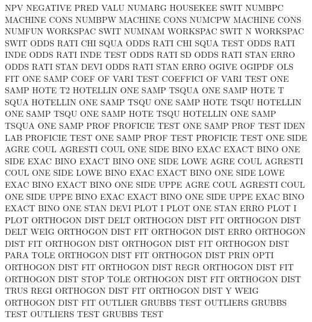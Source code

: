 NPV                                     NEGATIVE PRED VALU
NUMARG                                  HOUSEKEE SWIT
NUMBPC                                  MACHINE  CONS
NUMBPW                                  MACHINE  CONS
NUMCPW                                  MACHINE  CONS
NUMFUN                                  WORKSPAC SWIT
NUMNAM                                  WORKSPAC SWIT
N                                       WORKSPAC SWIT
ODDS     RATI CHI  SQUA                 ODDS     RATI CHI  SQUA TEST
ODDS     RATI INDE                      ODDS     RATI INDE TEST
ODDS     RATI SD                        ODDS     RATI STAN ERRO
ODDS     RATI STAN DEVI                 ODDS     RATI STAN ERRO
OGIVE                                   OGIPDF
OLS                                     FIT
ONE      SAMP COEF OF   VARI TEST       COEFFICI OF   VARI TEST
ONE      SAMP HOTE T2                   HOTELLIN ONE  SAMP TSQUA
ONE      SAMP HOTE T    SQUA            HOTELLIN ONE  SAMP TSQU
ONE      SAMP HOTE TSQU                 HOTELLIN ONE  SAMP TSQU
ONE      SAMP HOTE TSQU                 HOTELLIN ONE  SAMP TSQUA
ONE      SAMP PROF                      PROFICIE TEST
ONE      SAMP PROF TEST IDEN LAB        PROFICIE TEST
ONE      SAMP PROF TEST                 PROFICIE TEST
ONE      SIDE AGRE COUL                 AGRESTI  COUL
ONE      SIDE BINO EXAC                 EXACT    BINO
ONE      SIDE EXAC BINO                 EXACT    BINO
ONE      SIDE LOWE AGRE COUL            AGRESTI  COUL
ONE      SIDE LOWE BINO EXAC            EXACT    BINO
ONE      SIDE LOWE EXAC BINO            EXACT    BINO
ONE      SIDE UPPE AGRE COUL            AGRESTI  COUL
ONE      SIDE UPPE BINO EXAC            EXACT    BINO
ONE      SIDE UPPE EXAC BINO            EXACT    BINO
ONE      STAN DEVI PLOT                 I        PLOT
ONE      STAN ERRO PLOT                 I        PLOT
ORTHOGON DIST DELT                      ORTHOGON DIST FIT
ORTHOGON DIST DELT WEIG                 ORTHOGON DIST FIT
ORTHOGON DIST ERRO                      ORTHOGON DIST FIT
ORTHOGON DIST                           ORTHOGON DIST FIT
ORTHOGON DIST PARA TOLE                 ORTHOGON DIST FIT
ORTHOGON DIST PRIN OPTI                 ORTHOGON DIST FIT
ORTHOGON DIST REGR                      ORTHOGON DIST FIT
ORTHOGON DIST STOP TOLE                 ORTHOGON DIST FIT
ORTHOGON DIST TRUS REGI                 ORTHOGON DIST FIT
ORTHOGON DIST Y    WEIG                 ORTHOGON DIST FIT
OUTLIER                                 GRUBBS   TEST
OUTLIERS                                GRUBBS   TEST
OUTLIERS TEST                           GRUBBS   TEST
